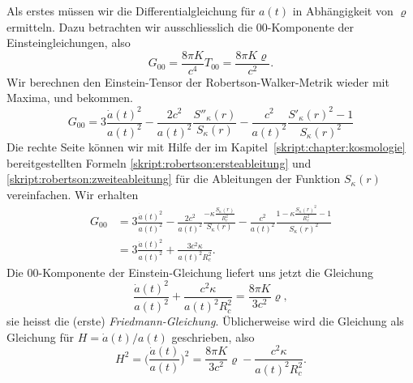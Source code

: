Als erstes müssen wir die Differentialgleichung für $a(t)$
in Abhängigkeit von $\varrho$ ermitteln.
Dazu betrachten wir ausschliesslich die $00$-Komponente der
Einsteingleichungen, also
\begin{equation}
G_{00} = \frac{8\pi K}{c^4} T_{00}=\frac{8\pi K\varrho}{c^2}.
\label{skript:friedmann:einstein}
\end{equation}
Wir berechnen den Einstein-Tensor der Robertson-Walker-Metrik
wieder mit Maxima, und bekommen.
\begin{equation}
G_{00}
=
3\frac{\dot a(t)^2}{a(t)^2}
-\frac{2c^2}{a(t)^2}\frac{S''_\kappa(r)}{S_\kappa(r)}
-\frac{c^2}{a(t)^2}
\frac{S'_\kappa(r)^2-1}{S_\kappa(r)^2}
\end{equation}
Die rechte Seite können wir mit Hilfe der im
Kapitel~\ref{skript:chapter:kosmologie} bereitgestellten Formeln
\eqref{skript:robertson:ersteableitung} und
\eqref{skript:robertson:zweiteableitung} für die Ableitungen der Funktion
$S_\kappa(r)$ vereinfachen.
Wir erhalten 
\begin{align*}
G_{00}
&=
3\frac{\dot a(t)^2}{a(t)^2}
-\frac{2c^2}{a(t)^2}\frac{-\kappa\displaystyle \frac{S_\kappa(r)}{R_c^2}}{S_\kappa(r)}
-\frac{c^2}{a(t)^2}
\frac{1-\kappa \frac{\displaystyle S_\kappa(r)^2}{R_c^2}-1}{S_\kappa(r)^2}
\\
&=
3\frac{\dot a(t)^2}{a(t)^2}
+\frac{3c^2\kappa}{a(t)^2R_c^2}.
\end{align*}
Die $00$-Komponente der Einstein-Gleichung liefert uns jetzt die Gleichung
\begin{equation}
\frac{\dot a(t)^2}{a(t)^2}
+
\frac{c^2\kappa}{a(t)^2R_c^2}
=
\frac{8\pi K}{3c^2}\varrho,
\end{equation}
sie heisst die (erste) {\em Friedmann-Gleichung}.
%
Üblicherweise wird die Gleichung als Gleichung für $H=\dot a(t)/a(t)$
geschrieben, also
\begin{equation}
H^2
=
\biggl(
\frac{\dot a(t)}{a(t)}
\biggr)^2
=
\frac{8\pi K}{3c^2}\varrho
-
\frac{c^2\kappa }{a(t)^2R_c^2}.
\label{skript:friedmann:friedmann}
\end{equation}


